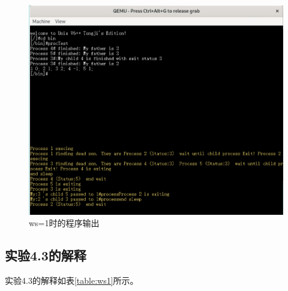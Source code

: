 \begin{figure}[!htbp]
    \centering
    \includegraphics[width=\textwidth]{images/ws1.png}
    \caption{ws=1时的程序输出}\label{ws1}
\end{figure}

\subsection{实验4.3的解释}


实验4.3的解释如表\ref{table:ws1}所示。

